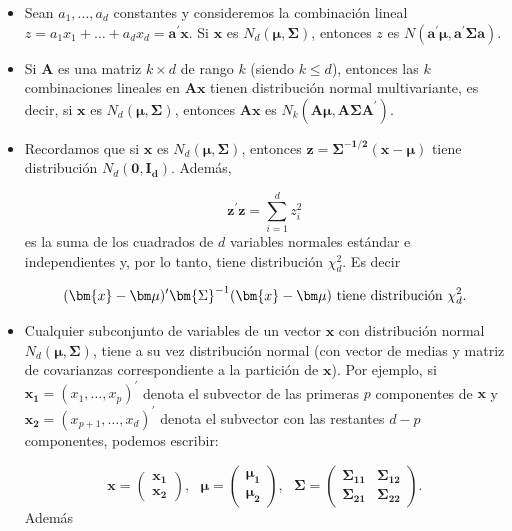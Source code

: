 \documentclass[
  a4paper,
  oneside]{scrbook}
\theoremstyle{definition}
\theoremstyle{definition}
\theoremstyle{definition}
\theoremstyle{definition}
\theoremstyle{remark}
\begin{document}
\begin{itemize}
\item
  Sean \(a_1,\ldots,a_d\) constantes y consideremos la combinación
  lineal \(z=a_1x_1+\ldots+a_dx_d=\bm{a}^\prime\bm{x}.\) Si \(\bm{x}\) es
  \(N_d(\bm{\mu},\bm\Sigma)\), entonces \(z\) es
  \(N(\bm{a}^\prime\bm{\mu}, \bm{a}^\prime\bm{\Sigma}\bm{a})\).
\item
  Si \(\bm{A}\) es una matriz \(k\times d\) de rango \(k\) (siendo
  \(k\leq d\)), entonces las \(k\) combinaciones lineales en
  \(\bm{A}\bm{x}\) tienen distribución normal multivariante, es decir,
  si \(\bm{x}\) es \(N_d(\bm{\mu},\bm\Sigma)\), entonces \(\bm{A}\bm{x}\) es
  \(N_k(\bm{A}\bm{\mu}, \bm{A}\bm{\Sigma}\bm{A}^\prime)\).
\item
  Recordamos que si \(\bm{x}\) es \(N_d(\bm{\mu},\bm\Sigma)\), entonces
  \(\bm{z}=\bm{\Sigma^{-1/2}}(\bm{x}-\bm\mu)\) tiene distribución \(N_d(\bm{0},\bm{I_d}).\)
  Además,

  \[\bm{z}^\prime{}\bm{z}=\sum_{i=1}^dz_i^2\] es la suma de
  los cuadrados de \(d\) variables normales estándar e independientes y,
  por lo tanto, tiene distribución \(\chi_d^2\). Es decir

  \[(\bm{x}-\bm\mu)^\prime{}\bm{\Sigma}^{-1}(\bm{x}-\bm\mu) \textnormal{ tiene distribución } \chi_d^2.\]
\item
  Cualquier subconjunto de variables de un vector \(\bm{x}\) con
  distribución normal \(N_d(\bm{\mu},\bm\Sigma)\), tiene a su vez
  distribución normal (con vector de medias y matriz de covarianzas
  correspondiente a la partición de \(\bm{x}\)). Por ejemplo, si
  \(\bm{x_1}=(x_1,\ldots,x_p)^\prime{}\) denota el subvector de las
  primeras \(p\) componentes de \(\bm{x}\) y
  \(\bm{x_2}=(x_{p+1},\ldots,x_d)^\prime{}\) denota el subvector con las
  restantes \(d-p\) componentes, podemos escribir:

  \[\bm{x}=\left(
  \begin{array}{c}
  \bm{x_1}\\ 
  \bm{x_2}
  \end{array}
  \right),\ \ \ \bm{\mu}=\left(\begin{array}{c}\bm{\mu_1}\\ \bm{\mu_2}\end{array}\right),\ \ \ \bm{\Sigma}=\left(\begin{array}{cc}\bm{\Sigma_{11}}&\bm{\Sigma_{12}}\\ \bm{\Sigma_{21}}&\bm{\Sigma_{22}}\end{array}\right).\]
  Además


\end{itemize}
\end{document}
